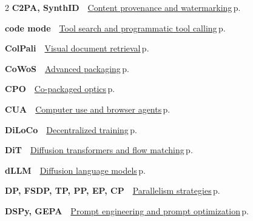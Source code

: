 \documentclass[10pt,a4paper,openany]{report}
\begin{document}
\begin{multicols}{2}
\textbf{\sffamily\color{accent}C2PA, SynthID}\ \ \hyperref[c:safety-14]{Content provenance and watermarking}\,{\color{muted}\scriptsize p.\,\pageref{c:safety-14}}\par\vspace{2pt}
\textbf{\sffamily\color{accent}code mode}\ \ \hyperref[c:agents-6]{Tool search and programmatic tool calling}\,{\color{muted}\scriptsize p.\,\pageref{c:agents-6}}\par\vspace{2pt}
\textbf{\sffamily\color{accent}ColPali}\ \ \hyperref[c:vlm-5]{Visual document retrieval}\,{\color{muted}\scriptsize p.\,\pageref{c:vlm-5}}\par\vspace{2pt}
\textbf{\sffamily\color{accent}CoWoS}\ \ \hyperref[c:hardware-9]{Advanced packaging}\,{\color{muted}\scriptsize p.\,\pageref{c:hardware-9}}\par\vspace{2pt}
\textbf{\sffamily\color{accent}CPO}\ \ \hyperref[c:hardware-10]{Co-packaged optics}\,{\color{muted}\scriptsize p.\,\pageref{c:hardware-10}}\par\vspace{2pt}
\textbf{\sffamily\color{accent}CUA}\ \ \hyperref[c:agents-9]{Computer use and browser agents}\,{\color{muted}\scriptsize p.\,\pageref{c:agents-9}}\par\vspace{2pt}
\textbf{\sffamily\color{accent}DiLoCo}\ \ \hyperref[c:training-8]{Decentralized training}\,{\color{muted}\scriptsize p.\,\pageref{c:training-8}}\par\vspace{2pt}
\textbf{\sffamily\color{accent}DiT}\ \ \hyperref[c:embodied-5]{Diffusion transformers and flow matching}\,{\color{muted}\scriptsize p.\,\pageref{c:embodied-5}}\par\vspace{2pt}
\textbf{\sffamily\color{accent}dLLM}\ \ \hyperref[c:arch-5]{Diffusion language models}\,{\color{muted}\scriptsize p.\,\pageref{c:arch-5}}\par\vspace{2pt}
\textbf{\sffamily\color{accent}DP, FSDP, TP, PP, EP, CP}\ \ \hyperref[c:training-0]{Parallelism strategies}\,{\color{muted}\scriptsize p.\,\pageref{c:training-0}}\par\vspace{2pt}
\textbf{\sffamily\color{accent}DSPy, GEPA}\ \ \hyperref[c:practice-3]{Prompt engineering and prompt optimization}\,{\color{muted}\scriptsize p.\,\pageref{c:practice-3}}\par\vspace{2pt}

\end{multicols}
\end{document}

